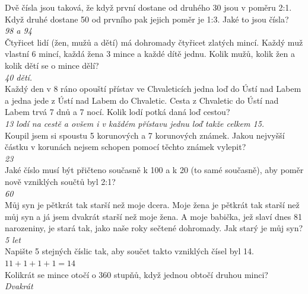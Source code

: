 \begin{multicols}{2}
\noindent
Dvě čísla jsou taková, že když první dostane od druhého 30 jsou
v poměru 2:1. Když druhé dostane 50 od prvního pak jejich poměr
je 1:3. Jaké to jsou čísla?\\[1 mm]
{\sl 98 a 94}\\

\noindent
Čtyřicet lidí (žen, mužů a dětí) má dohromady čtyřicet zlatých 
mincí. Každý muž vlastní 6 mincí, každá žena 3 mince a každé dítě jednu. 
Kolik mužů, kolik žen a kolik dětí se o mince dělí?\\[1 mm]
{\sl 40 dětí.}\\

\noindent
Každý den v 8 ráno opouští přístav ve Chvaleticích jedna 
loď do Ústí nad Labem a jedna jede z Ústí nad Labem do Chvaletic. 
Cesta z Chvaletic do Ústí nad Labem trvá 7 dnů a 7 nocí. Kolik 
lodí potká daná loď cestou?\\[1 mm]
{\sl 13 lodí na cestě a ovšem i v každém přístavu jednu loď takže
celkem 15.}\\

\noindent
Koupil jsem si spoustu 5 korunových a 7 korunových známek. 
Jakou nejvyšší částku v korunách nejsem schopen pomocí těchto 
známek vylepit?\\[1 mm]
{\sl 23}\\

\noindent
Jaké číslo musí být přičteno současně k 100 a k 20 (to samé 
současně), aby poměr nově vzniklých součtů byl 2:1?\\[1 mm]
{\sl 60}\\

\noindent
Můj syn je pětkrát tak starší než moje dcera. Moje žena je 
pětkrát tak starší než můj syn a já jsem dvakrát starší než moje 
žena. A moje babička, jež slaví dnes 81 narozeniny, je stará 
tak, jako naše roky sečtené dohromady. Jak starý je můj syn?\\[1 mm]
{\sl 5 let}\\

\noindent
Napište 5 stejných číslic tak, aby součet takto vzniklých 
čísel byl 14.\\[1 mm]
{\sl $11+1+1+1=14$}\\

\noindent
Kolikrát se mince otočí o 360 stupňů, když jednou obtočí 
druhou minci?\\[1 mm]
{\sl Dvakrát}\\


\end{multicols}
